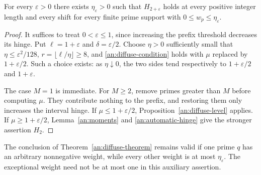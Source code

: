 \begin{theorem}
\label{an:diffuse-theorem}
For every \(\varepsilon>0\) there exists \(\eta_\varepsilon>0\) such
that \(H_{2+\varepsilon}\) holds at every positive integer length and
every shift for every finite prime support with
\(0\le w_p\le\eta_\varepsilon\).
\end{theorem}

\begin{proof}
It suffices to treat \(0<\varepsilon\le1\), since increasing the prefix
threshold decreases its hinge. Put \(\ell=1+\varepsilon\) and
\(\delta=\varepsilon/2\). Choose \(\eta>0\) sufficiently small that
\(\eta\le\varepsilon^2/128\), \(r=\lfloor\ell/\eta\rfloor\ge8\),
and \eqref{an:diffuse-condition} holds with \(\mu\) replaced by
\(1+\varepsilon/2\). Such a choice exists: as \(\eta\downarrow0\),
the two sides tend respectively to \(1+\varepsilon/2\) and
\(1+\varepsilon\).

The case \(M=1\) is immediate. For \(M\ge2\), remove primes greater
than \(M\) before computing \(\mu\). They contribute nothing to the
prefix, and restoring them only increases the interval hinge. If
\(\mu\le1+\varepsilon/2\), Proposition~\ref{an:diffuse-level} applies.
If \(\mu\ge1+\varepsilon/2\), Lemma~\ref{an:moments} and
\eqref{an:automatic-hinge} give the stronger assertion \(H_2\).
\end{proof}

\begin{corollary}
\label{an:one-heavy}
The conclusion of Theorem~\ref{an:diffuse-theorem} remains valid if one
prime \(q\) has an arbitrary nonnegative weight, while every other
weight is at most \(\eta_\varepsilon\). The exceptional weight need
not be at most one in this auxiliary assertion.
\end{corollary}

